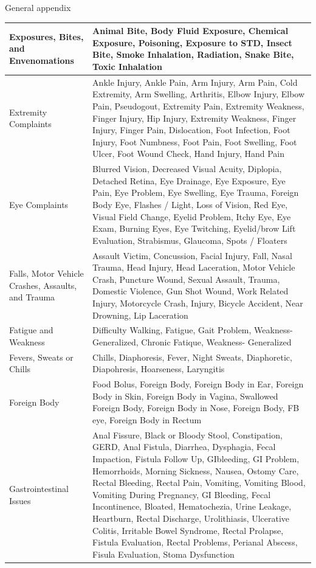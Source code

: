 \documentclass[,,nonblindrev]{informs}
\begin{document}
\begin{APPENDIX}{General appendix}
\begin{longtable}{|p{5cm}|p{12cm}|}
\hline
Exposures, Bites, and Envenomations & Animal Bite, Body Fluid Exposure, Chemical Exposure, Poisoning, Exposure to STD, Insect Bite, Smoke Inhalation, Radiation, Snake Bite, Toxic Inhalation \\
\hline
Extremity Complaints & Ankle Injury, Ankle Pain, Arm Injury, Arm Pain, Cold Extremity, Arm Swelling, Arthritis, Elbow Injury, Elbow Pain, Pseudogout, Extremity Pain, Extremity Weakness, Finger Injury, Hip Injury, Extremity Weakness, Finger Injury, Finger Pain, Dislocation, Foot Infection, Foot Injury, Foot Numbness, Foot Pain, Foot Swelling, Foot Ulcer, Foot Wound Check, Hand Injury, Hand Pain \\
\hline
Eye Complaints & Blurred Vision, Decreased Visual Acuity, Diplopia, Detached Retina, Eye Drainage, Eye Exposure, Eye Pain, Eye Problem, Eye Swelling, Eye Trauma, Foreign Body Eye, Flashes / Light, Loss of Vision, Red Eye, Visual Field Change, Eyelid Problem, Itchy Eye, Eye Exam, Burning Eyes, Eye Twitching, Eyelid/brow Lift Evaluation, Strabismus, Glaucoma, Spots / Floaters \\
\hline
Falls, Motor Vehicle Crashes, Assaults, and Trauma & Assault Victim, Concussion, Facial Injury, Fall, Nasal Trauma, Head Injury, Head Laceration, Motor Vehicle Crash, Puncture Wound, Sexual Assault, Trauma, Domestic Violence, Gun Shot Wound, Work Related Injury, Motorcycle Crash, Injury, Bicycle Accident, Near Drowning, Lip Laceration \\
\hline
Fatigue and Weakness & Difficulty Walking, Fatigue, Gait Problem, Weakness-Generalized, Chronic Fatique, Weakness- Generalized \\
\hline
Fevers, Sweats or Chills & Chills, Diaphoresis, Fever, Night Sweats, Diaphoretic, Diapohresis, Hoarseness, Laryngitis \\
\hline
Foreign Body & Food Bolus, Foreign Body, Foreign Body in Ear, Foreign Body in Skin, Foreign Body in Vagina, Swallowed Foreign Body, Foreign Body in Nose, Foreign Body, FB eye, Foreign Body in Rectum \\
\hline
Gastrointestinal Issues & Anal Fissure, Black or Bloody Stool, Constipation, GERD, Anal Fistula, Diarrhea, Dysphagia, Fecal Impaction, Fistula Follow Up, GIbleeding, GI Problem, Hemorrhoids, Morning Sickness, Nausea, Ostomy Care, Rectal Bleeding, Rectal Pain, Vomiting, Vomiting Blood, Vomiting During Pregnancy, GI Bleeding, Fecal Incontinence, Bloated, Hematochezia, Urine Leakage, Heartburn, Rectal Discharge, Urolithiasis, Ulcerative Colitis, Irritable Bowel Syndrome, Rectal Prolapse, Fistula Evaluation, Rectal Problems, Perianal Abscess, Fisula Evaluation, Stoma Dysfunction \\

\end{longtable}
\end{APPENDIX}
\end{document}
